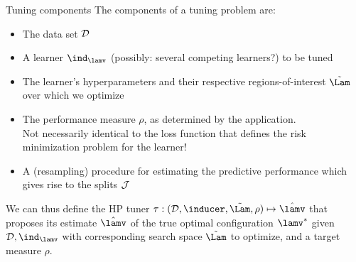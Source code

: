 \documentclass[11pt,compress,t,notes=noshow, xcolor=table]{beamer}
\begin{document}
\begin{vbframe}{Tuning components}
The components of a tuning problem are: 

\begin{itemize}
\item The data set $\mathcal{D}$
\item A learner $\Ilam$ (possibly: several competing learners?) to be tuned %
\item The learner's hyperparameters and their respective regions-of-interest $\LamS$ over which we optimize %
\item The performance measure $\rho$, as determined by the application.\\ Not necessarily identical to the loss function that defines the risk minimization problem for the learner!\\ 
\item A (resampling) procedure for estimating the predictive performance which gives rise to the splits $\mathcal{J}$
\end{itemize}
\medskip
We can thus define the HP tuner $\tau: (\D,\inducer,\LamS,\rho)\mapsto \lamh$ that proposes its estimate $\lamh$ of the true optimal configuration $\lams$ given $\D, \Ilam$ with corresponding search space $\LamS$ to optimize, and a target measure $\rho$.



\end{vbframe}





\end{document}
